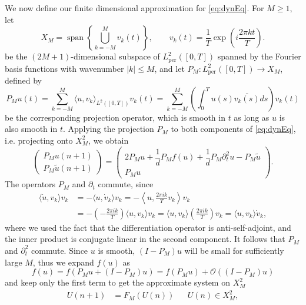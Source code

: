 \documentclass[12pt,reqno]{amsart}
\def\per{\textrm{per}}
\DeclareMathOperator{\spn}{span}
\begin{document}
We now define our finite dimensional approximation for \cref{eq:dynEq}. For $M \geq 1$, let 
\begin{equation}\label{eq:XM}
X_M = \spn\left\{ \bigcup_{k = -M}^M v_k(t) \right\}, \qquad
v_k(t) = \frac{1}{T} \exp\left( i \frac{2 \pi k t}{T} \right).
\end{equation}
be the $(2M+1)$-dimensional subspace of $L_\per^2([0,T])$ spanned by the Fourier basis functions with wavenumber $|k| \leq M$, and let $P_M: L_\per^2([0,T]) \rightarrow X_M$, defined by
\begin{equation}\label{eq:PM}
P_M u(t) = \sum_{k=-M}^M \langle u, v_k \rangle_{L^2([0,T])} v_k(t)
= \sum_{k=-M}^M \left( \int_0^T u(s) \overline{v_k(s)} ds \right) v_k(t)
\end{equation}
be the corresponding projection operator, which is smooth in $t$ as long as $u$ is also smooth in $t$. Applying the projection $P_M$ to both components of \cref{eq:dynEq}, i.e. projecting onto $X_M^2$, we obtain
\begin{equation}
\begin{pmatrix}P_M u(n+1) \\ P_M \tilde{u}(n+1) \end{pmatrix} = 
\begin{pmatrix}2 P_M u  + \dfrac{1}{d}P_M f(u) + \dfrac{1}{d} P_M \partial_t^2 u - P_M \tilde{u} \\
P_M u
\end{pmatrix}.
\end{equation}
The operators $P_M$ and $\partial_t$ commute, since 
\begin{align*}
\langle \dot{u}, v_k \rangle v_k &= -\langle u, \dot{v}_k \rangle v_k
= -\left\langle u, \frac{2 \pi i k}{T} v_k \right\rangle v_k \\
&= -\left( -\frac{2 \pi i k}{T} \right) \langle u, v_k \rangle v_k
= \langle u, v_k \rangle \left( \frac{2 \pi i k}{T} \right) v_k 
= \langle u, v_k \rangle \dot{v}_k,
\end{align*}
where we used the fact that the differentiation operator is anti-self-adjoint, and the inner product is conjugate linear in the second component. It follows that $P_M$ and $\partial_t^2$ commute. Since $u$ is smooth, $(I-P_M)u$ will be small for sufficiently large $M$, thus we expand $f(u)$ as
\[
f(u) = f( P_M u + (I-P_M)u) = f(P_M u) + \mathcal{O}((I-P_M)u)
\]
and keep only the first term to get the approximate system on $X_M^2$
\begin{align}\label{eq:dynEqM}
U(n+1) &= F_M(U(n)) && U(n) \in X_M^2,
\end{align}
\end{document}
